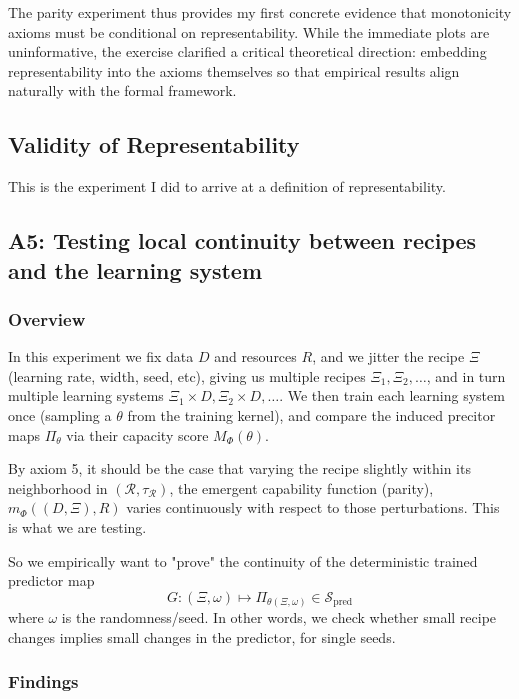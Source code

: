 \documentclass[12pt]{article}
\begin{document}
The parity experiment thus provides my first concrete evidence that monotonicity axioms must be conditional on representability. While the immediate plots are uninformative, the exercise clarified a critical theoretical direction: embedding representability into the axioms themselves so that empirical results align naturally with the formal framework.

\clearpage

\subsection{Validity of Representability}

This is the experiment I did to arrive at a definition of representability.

\clearpage

\subsection{A5: Testing local continuity between recipes and the learning system}

\subsubsection{Overview}

In this experiment we fix data $D$ and resources $R$, and we jitter the recipe $\Xi$ (learning rate, width, seed, etc), giving us multiple recipes $\Xi_1,\Xi_2,\dots$, and in turn multiple learning systems $\Xi_1\times D, \Xi_2\times D,\dots$. We then train each learning system once (sampling a $\theta$ from the training kernel), and compare the induced precitor maps $\Pi_\theta$ via their capacity score $M_\Phi(\theta)$.

By axiom 5, it should be the case that varying the recipe slightly within its neighborhood in $(\mathcal R, \tau_\mathcal R)$, the emergent capability function (parity), $m_\Phi((D,\Xi),R)$ varies continuously with respect to those perturbations. This is what we are testing. 

So we empirically want to "prove" the continuity of the deterministic trained predictor map
\[
G:(\Xi, \omega)\mapsto \Pi_{\theta(\Xi, \omega)} \in \mathcal S _{\text{pred}}
\]
where $\omega$ is the randomness/seed. In other words, we check whether small recipe changes implies small changes in the predictor, for single seeds.

\clearpage
\subsubsection{Findings}
\end{document}
